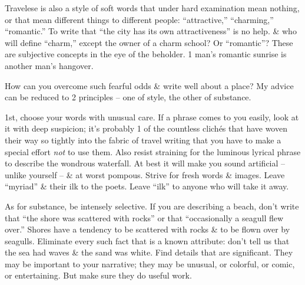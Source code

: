 \documentclass{article}
\begin{document}
Travelese is also a style of soft words that under hard examination mean nothing, or that mean different things to different people: ``attractive,'' ``charming,'' ``romantic.'' To write that ``the city has its own attractiveness'' is no help. \& who will define ``charm,'' except the owner of a charm school? Or ``romantic''? These are subjective concepts in the eye of the beholder. 1 man's romantic sunrise is another man's hangover.

How can you overcome such fearful odds \& write well about a place? My advice can be reduced to 2 principles -- one of style, the other of substance.

1st, choose your words with unusual care. If a phrase comes to you easily, look at it with deep suspicion; it's probably 1 of the countless clich\'es that have woven their way so tightly into the fabric of travel writing that you have to make a special effort \textit{not} to use them. Also resist straining for the luminous lyrical phrase to describe the wondrous waterfall. At best it will make you sound artificial -- unlike yourself -- \& at worst pompous. Strive for fresh words \& images. Leave ``myriad'' \&  their ilk to the poets. Leave ``ilk'' to anyone who will take it away.

As for substance, be intensely selective. If you are describing a beach, don't write that ``the shore was scattered with rocks'' or that ``occasionally a seagull flew over.'' Shores have a tendency to be scattered with rocks \& to be flown over by seagulls. Eliminate every such fact that is a known attribute: don't tell us that the sea had waves \& the sand was white. Find details that are significant. They may be important to your narrative; they may be unusual, or colorful, or comic, or entertaining. But make sure they do useful work.
\end{document}
